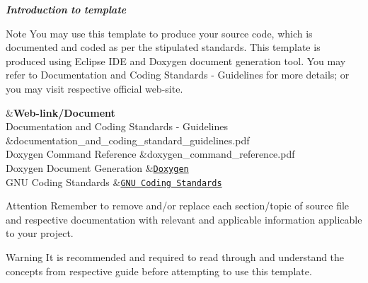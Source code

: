 {\itshape {\bfseries Introduction} {\bfseries to} {\bfseries template}  } \begin{DoxyNote}{Note}
You may use this template to produce your source code, which is documented and coded as per the stipulated standards. This template is produced using Eclipse I\+D\+E and Doxygen document generation tool. You may refer to Documentation and Coding Standards -\/ Guidelines for more details; or you may visit respective official web-\/site. ~\newline
\begin{TabularC}{2}
\hline
{}&{\bf Web-\/link/\+Document  }\\
Documentation and Coding Standards -\/ Guidelines &documentation\+\_\+and\+\_\+coding\+\_\+standard\+\_\+guidelines.\+pdf \\
Doxygen Command Reference &doxygen\+\_\+command\+\_\+reference.\+pdf \\
Doxygen Document Generation &\href{http://www.stack.nl/~dimitri/doxygen}{\tt Doxygen} \\
G\+N\+U Coding Standards &\href{http://www.gnu.org/prep/standards/standards.html}{\tt G\+N\+U Coding Standards} \\
\end{TabularC}

\end{DoxyNote}
\begin{DoxyAttention}{Attention}
Remember to remove and/or replace each section/topic of source file and respective documentation with relevant and applicable information applicable to your project. 
\end{DoxyAttention}
\begin{DoxyWarning}{Warning}
It is recommended and required to read through and understand the concepts from respective guide before attempting to use this template.
\end{DoxyWarning}




